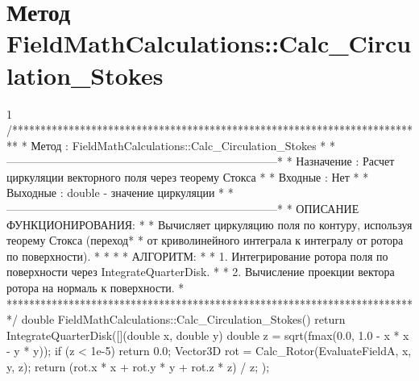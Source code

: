 \section{Метод FieldMathCalculations::Calc\_Circulation\_Stokes}
\footnotesize
\begin{listing}{1}
/*************************************************************************
* Метод         : FieldMathCalculations::Calc_Circulation_Stokes         *
*------------------------------------------------------------------------*
* Назначение    : Расчет циркуляции векторного поля через теорему Стокса *
* Входные       : Нет                                                    *
* Выходные      : double - значение циркуляции                           *
*------------------------------------------------------------------------*
* ОПИСАНИЕ ФУНКЦИОНИРОВАНИЯ:                                             *
* Вычисляет циркуляцию поля по контуру, используя теорему Стокса (переход*
* от криволинейного интеграла к интегралу от ротора по поверхности).     *
* *
* АЛГОРИТМ:                                                              *
* 1. Интегрирование ротора поля по поверхности через IntegrateQuarterDisk. *
* 2. Вычисление проекции вектора ротора на нормаль к поверхности.         *
*************************************************************************/
double FieldMathCalculations::Calc_Circulation_Stokes() {
    return IntegrateQuarterDisk([](double x, double y) {
        double z = sqrt(fmax(0.0, 1.0 - x * x - y * y));
        if (z < 1e-5) return 0.0;
        Vector3D rot = Calc_Rotor(EvaluateFieldA, x, y, z);
        return (rot.x * x + rot.y * y + rot.z * z) / z;
    });
}
\end{listing}
\normalsize

\pagebreak

